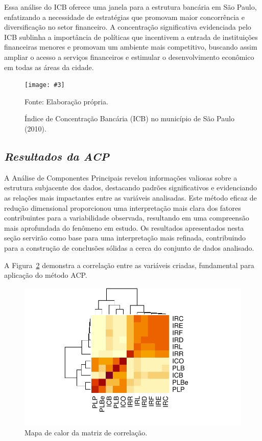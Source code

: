 \documentclass[a4paper,12pt]{article}
\newcommand{\fig}[4]{%
  \begin{figure}[H]
    \centering
    \caption{#1}
    \label{#2}
    \texttt{[image: \#3]}
    
    \vspace{0.5cm}
    
    \begin{footnotesize}
      Fonte: #4
    \end{footnotesize}
  \end{figure}
}
\begin{document}
Essa análise do ICB oferece uma janela para a estrutura bancária em São
Paulo, enfatizando a necessidade de estratégias que promovam maior
concorrência e diversificação no setor financeiro. A concentração
significativa evidenciada pelo ICB sublinha a importância de políticas
que incentivem a entrada de instituições financeiras menores e promovam
um ambiente mais competitivo, buscando assim ampliar o acesso a serviços
financeiros e estimular o desenvolvimento econômico em todas as áreas da
cidade.

\fig{Índice de Concentração Bancária (ICB) no município de São Paulo (2010).}{fig:icb}{exports/icb2.pdf}{Elaboração própria.}

\newpage

\hypertarget{resultados-da-acp}{%
\subsection{\texorpdfstring{\emph{Resultados da
ACP}}{Resultados da ACP}}\label{resultados-da-acp}}

A Análise de Componentes Principais revelou informações valiosas sobre a
estrutura subjacente dos dados, destacando padrões significativos e
evidenciando as relações mais impactantes entre as variáveis analisadas.
Este método eficaz de redução dimensional proporcionou uma interpretação
mais clara dos fatores contribuintes para a variabilidade observada,
resultando em uma compreensão mais aprofundada do fenômeno em estudo. Os
resultados apresentados nesta seção servirão como base para uma
interpretação mais refinada, contribuindo para a construção de
conclusões sólidas a cerca do conjunto de dados analisado.

A Figura~\ref{fig-cor-heatmap} demonstra a correlação entre as variáveis
criadas, fundamental para aplicação do método ACP.

\begin{figure}

\caption{\label{fig-cor-heatmap}Mapa de calor da matriz de correlação.}

{\centering \includegraphics{main_files/figure-pdf/fig-cor-heatmap-1.pdf}

}

\end{figure}
\end{document}
